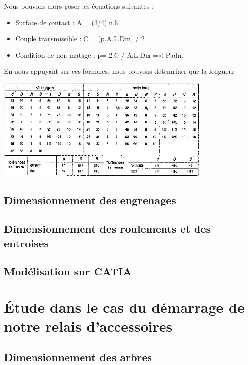 \documentclass{config}
\begin{document}
\begin{spacing}{1.2}
Nous pouvons alors poser les équations suivantes :

\begin{itemize}
    \item Surface de contact : A = (3/4).n.h
    \item Couple transmissible : C = (p.A.L.Dm) / 2
    \item Condition de non matage : p= 2.C / A.L.Dm =<  Padm
\end{itemize}

En nous appuyant sur ces formules, nous pouvons détemriner que la longueur

\begin{center}
\includegraphics[width=0.8\textwidth]{tab_cannelures.PNG}
\end{center}
    



\subsection{Dimensionnement des engrenages}

\subsection{Dimensionnement des roulements et des entroises}

\subsection{Modélisation sur CATIA}


\section{Étude dans le cas du démarrage de notre relais d'accessoires}

\subsection{Dimensionnement des arbres}


\end{spacing}
\end{document}
